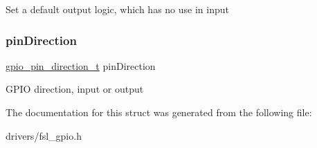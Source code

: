 Set a default output logic, which has no use in input \mbox{\label{struct__gpio__pin__config_ab0b8ce6b7e068de24659c0c382fa481c}} 
\subsubsection{\texorpdfstring{pinDirection}{pinDirection}}
{\footnotesize\ttfamily \mbox{\hyperlink{group__gpio_gaf7d75755774a0f20385fbdda546f1f1d}{gpio\+\_\+pin\+\_\+direction\+\_\+t}} pin\+Direction}

G\+P\+IO direction, input or output 

The documentation for this struct was generated from the following file\+:\begin{DoxyCompactItemize}
\item 
drivers/fsl\+\_\+gpio.\+h\end{DoxyCompactItemize}
